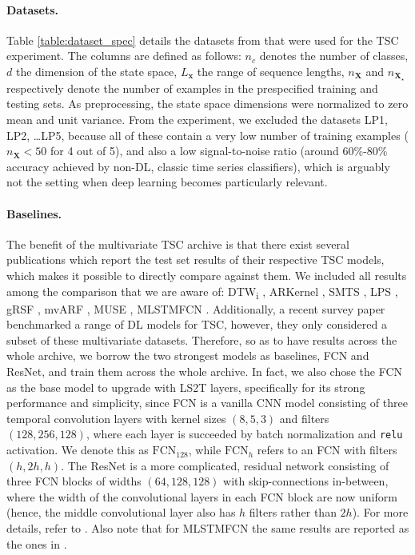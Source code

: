 \documentclass{article} \usepackage{iclr2021_conference,times}
\newcommand{\bx}{\mathbf{x}}
\newcommand{\bX}{\mathbf{X}}
\newcommand{\FCN}[1]{\ensuremath{\text{FCN}_{#1}}}
\theoremstyle{plain}
\theoremstyle{definition}
\begin{document}
\paragraph{Datasets.}
Table \ref{table:dataset_spec} details the datasets from \citet{baydogan2015multivarate} that were used for the TSC experiment. The columns are defined as follows: $n_c$ denotes the number of classes, $d$ the dimension of the state space, $L_\bx$ the range of sequence lengths, $n_\bX$ and $n_{\bX_\star}$ respectively denote the number of examples in the prespecified training and testing sets. As preprocessing, the state space dimensions were normalized to zero mean and unit variance. From the experiment, we excluded the datasets {\sc LP1, LP2, \dots LP5}, because all of these contain a very low number of training examples ($n_\bX < 50$ for 4 out of 5), and also a low signal-to-noise ratio (around 60\%-80\% accuracy achieved by non-DL, classic time series classifiers), which is arguably not the setting when deep learning becomes particularly relevant.

\paragraph{Baselines.} The benefit of the multivariate TSC archive \citep{baydogan2015multivarate} is that there exist several publications which report the test set results of their respective TSC models, which makes it possible to directly compare against them. We included all results among the comparison that we are aware of: DTW\textsubscript{i} \citep{Sakoe1978DTW}, ARKernel \citep{Cuturi2011AR}, SMTS \citep{baydogan2015learning}, LPS \citep{Baydogan2015TimeSR}, gRSF \citep{karlsson2016generalized}, mvARF \citep{tuncel2018autoregressive}, MUSE \citep{Schfer2017MUSE}, MLSTMFCN \citep{Karim2019LSTMFCN}. Additionally, a recent survey paper \citep{Fawaz2019DLforTSC} benchmarked a range of DL models for TSC, however, they only considered a subset of these multivariate datasets. Therefore, so as to have results across the whole archive, we borrow the two strongest models as baselines, FCN and ResNet, and train them across the whole archive. In fact, we also chose the FCN as the base model to upgrade with LS2T layers, specifically for its strong performance and simplicity, since FCN is a vanilla CNN model consisting of three temporal convolution layers with kernel sizes $(8, 5, 3)$ and filters $(128, 256, 128)$, where each layer is succeeded by batch normalization and \texttt{relu} activation. We denote this as \FCN{128}, while \FCN{h} refers to an FCN with filters $(h, 2h, h)$.
 The ResNet is a more complicated, residual network \citep{he2016deep} consisting of three FCN blocks of widths $(64, 128, 128)$ with skip-connections in-between, where the width of the convolutional layers in each FCN block are now uniform (hence, the middle convolutional layer also has $h$ filters rather than $2h$). For more details, refer to \citet{Fawaz2019DLforTSC,Wang2017TSCfromScratch}. Also note that for MLSTMFCN the same results are reported as the ones in \citet{Schfer2017MUSE}.
\end{document}
